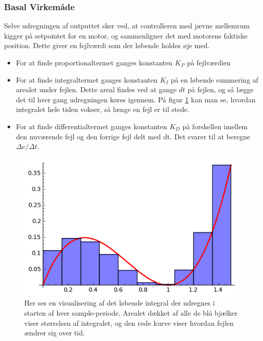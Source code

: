\subsubsection{Basal Virkemåde}

Selve udregningen af outputtet sker ved, at controlleren med jævne mellemrum kigger på setpointet for en motor, og sammenligner det med motorens faktiske position. Dette giver en fejlværdi som der løbende holdes øje med. 
\begin{itemize}
\item For at finde proportionaltermet ganges konstanten $K_{P}$ på fejlværdien
\item For at finde integraltermet ganges konstanten $K_{I}$ på en løbende summering af arealet under fejlen. Dette areal findes ved at gange $dt$ på fejlen, og så lægge det til hver gang udregningen køres igennem. På figur \ref{fig:Riemann} kan man se, hvordan integralet hele tiden vokser, så længe en fejl er til stede.
\item For at finde differentialtermet ganges konstanten $K_{D}$ på forskellen imellem den nuværende fejl og den forrige fejl delt med dt. Det svarer til at beregne $\Delta e/\Delta t$.
\end{itemize}

\begin{figure}[ht]
	\begin{center}
	\includegraphics[scale=0.8]{Billeder/RiemannSum.png}
	\end{center}		
	\caption{Her ses en visualisering af det løbende integral der udregnes i starten af hver sample-periode. Arealet dækket af alle de blå bjælker viser størrelsen af integralet, og den røde kurve viser hvordan fejlen ændrer sig over tid.}
	\label{fig:Riemann}
\end{figure}

